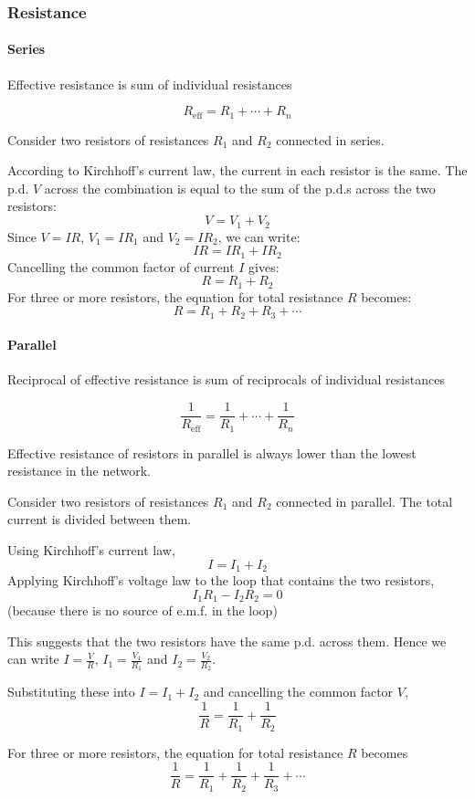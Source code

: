 \subsubsection{Resistance}
\paragraph{Series}
Effective resistance is sum of individual resistances

\begin{equation}
R_{\text{eff}} = R_1 + \cdots + R_n
\end{equation}

\begin{derivation}
Consider two resistors of resistances $R_1$ and $R_2$ connected in series. 

According to Kirchhoff’s current law, the current in each resistor is the same. The p.d. $V$ across the combination is equal to the sum of the p.d.s across the two resistors:
\[ V = V_1+V_2 \]
Since $V = IR$, $V_1 = IR_1$ and $V_2 = IR_2$, we can write:
\[ IR = IR_1+IR_2 \]
Cancelling the common factor of current $I$ gives:
\[ R = R_1+R_2 \]
For three or more resistors, the equation for total resistance $R$ becomes:
\[ R = R_1+R_2+R_3+\cdots \]
\end{derivation}

\paragraph{Parallel}
Reciprocal of effective resistance is sum of reciprocals of individual resistances

\begin{equation}
\frac{1}{R_\text{eff}} = \frac{1}{R_1} + \cdots + \frac{1}{R_n}
\end{equation}

\begin{remark}
Effective resistance of resistors in parallel is always lower than the lowest resistance in the network.
\end{remark}

\begin{derivation}
Consider two resistors of resistances $R_1$ and $R_2$ connected in parallel. The total current is divided between them. 

Using Kirchhoff's current law,
\[ I = I_1+I_2 \]
Applying Kirchhoff's voltage law to the loop that contains the two resistors,
\[ I_1R_1 - I_2R_2 = 0 \]
(because there is no source of e.m.f. in the loop)

This suggests that the two resistors have the same p.d. across them. Hence we can write $I=\frac{V}{R}$, $I_1=\frac{V_1}{R_1}$ and $I_2=\frac{V_2}{R_2}$.

Substituting these into $I = I_1+I_2$ and cancelling the common factor $V$,
\[ \frac{1}{R} = \frac{1}{R_1} + \frac{1}{R_2} \]

For three or more resistors, the equation for total resistance $R$ becomes
\[ \frac{1}{R} = \frac{1}{R_1} + \frac{1}{R_2} + \frac{1}{R_3} + \cdots \]
\end{derivation}

